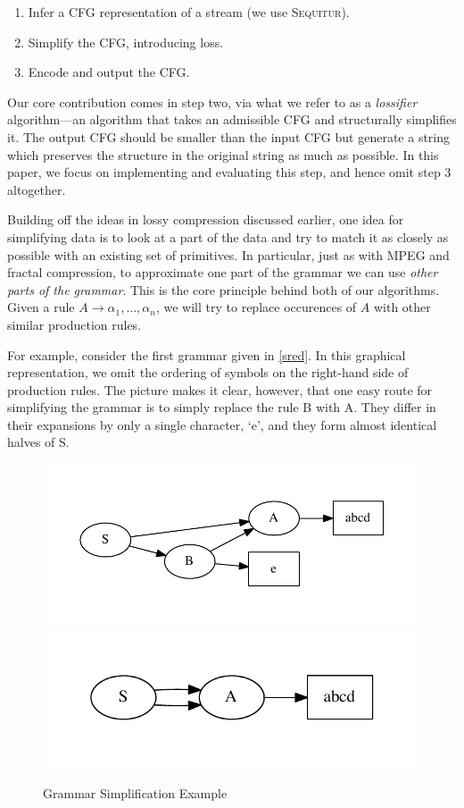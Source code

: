 \documentclass[11pt]{article}
\newcommand{\Sequitur}{\textsc{Sequitur}\xspace}
\begin{document}
\begin{enumerate}
  \item Infer a CFG representation of a stream (we use \Sequitur).
  \item Simplify the CFG, introducing loss.
  \item Encode and output the CFG.
\end{enumerate}

Our core contribution comes in step two, via what we refer to as a
\emph{lossifier} algorithm---an algorithm that takes an admissible CFG and
structurally simplifies it.  The output CFG should be smaller than the input
CFG but generate a string which preserves the structure in the original string
as much as possible.  In this paper, we focus on implementing and evaluating
this step, and hence omit step 3 altogether.

Building off the ideas in lossy compression discussed earlier, one idea for
simplifying data is to look at a part of the data and try to match it as
closely as possible with an existing set of primitives.  In particular, just as
with MPEG and fractal compression, to approximate one part of the grammar we
can use \emph{other parts of the grammar}.  This is the core principle behind
both of our algorithms.  Given a rule $A \rightarrow \alpha_1, \ldots,
\alpha_n$, we will try to replace occurences of $A$ with other similar
production rules.

For example, consider the first grammar given in \autoref{sred}.  In this
graphical representation, we omit the ordering of symbols on the right-hand
side of production rules.  The picture makes it clear, however, that one easy
route for simplifying the grammar is to simply replace the rule B with A.  They
differ in their expansions by only a single character, `e', and they form
almost identical halves of S.

\begin{figure}[t]
\centering
\includegraphics[scale=0.6]{include/sred1.pdf}
\includegraphics[scale=0.6]{include/sred2.pdf}
\caption{Grammar Simplification Example}
\label{sred}
\end{figure}
\end{document}
